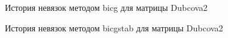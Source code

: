 
\begin{figure}[H]
    \renewcommand{\figurename}{Рисунок}
    \caption{История невязок методом bicg для матрицы Dubcova2}
    \label{fig:image_1}
\end{figure}

\begin{figure}[H]
    \renewcommand{\figurename}{Рисунок}
    \caption{История невязок методом bicgstab для матрицы Dubcova2}
    \label{fig:image_2}
\end{figure}

